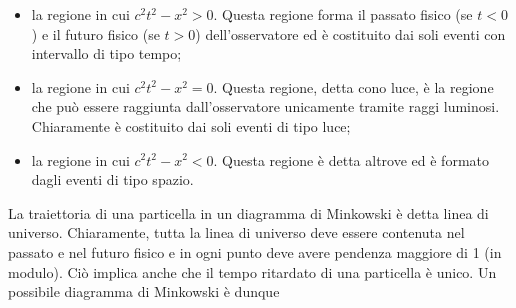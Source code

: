 \documentclass[a4paper,11pt]{book}
\theoremstyle{theorem}
\theoremstyle{definition}
\begin{document}
\begin{itemize}
	\item la regione in cui $c^2t^2-x^2>0$. Questa regione forma il passato fisico (se $t<0$) e il futuro fisico (se $t>0$) dell'osservatore ed è costituito dai soli eventi con intervallo di tipo tempo;
	\item la regione in cui $c^2t^2-x^2=0$. Questa regione, detta cono luce, è la regione che può essere raggiunta dall'osservatore unicamente tramite raggi luminosi. Chiaramente è costituito dai soli eventi di tipo luce;
	\item la regione in cui $c^2t^2-x^2<0$. Questa regione è detta altrove ed è formato dagli eventi di tipo spazio.
\end{itemize}
La traiettoria di una particella in un diagramma di Minkowski è detta linea di universo. Chiaramente, tutta la linea di universo deve essere contenuta nel passato e nel futuro fisico e in ogni punto deve avere pendenza maggiore di 1 (in modulo). Ciò implica anche che il tempo ritardato di una particella è unico. Un possibile diagramma di Minkowski è dunque
\begin{figure}[h]
	\centering
\end{figure}
\end{document}

